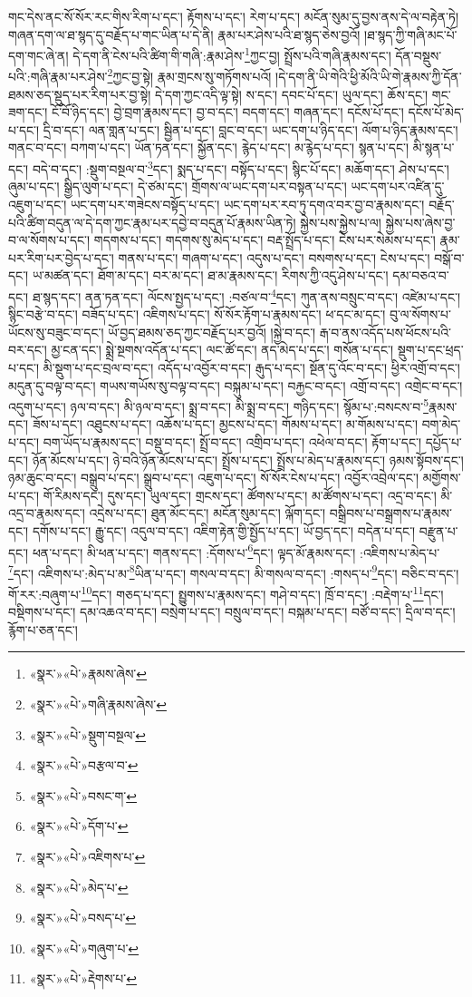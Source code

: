 གང་དེས་ནང་སོ་སོར་རང་གིས་རིག་པ་དང་། རྟོགས་པ་དང་། རེག་པ་དང་། མངོན་སུམ་དུ་བྱས་ནས་དེ་ལ་བརྟེན་ཏེ། གཞན་དག་ལ་ཐ་སྙད་དུ་བརྗོད་པ་གང་ཡིན་པ་དེ་ནི། རྣམ་པར་ཤེས་པའི་ཐ་སྙད་ཅེས་བྱའོ། །ཐ་སྙད་ཀྱི་གཞི་མང་པོ་དག་གང་ཞེ་ན། དེ་དག་ནི་ངེས་པའི་ཚིག་གི་གཞི་:རྣམ་ཤེས་\footnote{«སྣར་»«པེ་»རྣམས་ཞེས་}ཀྱང་བྱ། སྤྲོས་པའི་གཞི་རྣམས་དང་། དོན་བསྡུས་པའི་:གཞི་རྣམ་པར་ཤེས་\footnote{«སྣར་»«པེ་»གཞི་རྣམས་ཞེས་}ཀྱང་བྱ་སྟེ། རྣམ་གྲངས་སུ་གཏོགས་པའོ། །དེ་དག་ནི་ཡི་གེའི་ཕྱི་མོའི་ཡི་གེ་རྣམས་ཀྱི་དོན་ཐམས་ཅད་སྡུད་པར་རིག་པར་བྱ་སྟེ། དེ་དག་ཀྱང་འདི་ལྟ་སྟེ། ས་དང་། དབང་པོ་དང་། ཡུལ་དང་། ཆོས་དང་། གང་ཟག་དང་། ངོ་བོ་ཉིད་དང་། བྱེ་བྲག་རྣམས་དང་། བྱ་བ་དང་། བདག་དང་། གཞན་དང་། དངོས་པོ་དང་། དངོས་པོ་མེད་པ་དང་། དྲི་བ་དང་། ལན་གླན་པ་དང་། སྦྱིན་པ་དང་། བླང་བ་དང་། ཡང་དག་པ་ཉིད་དང་། ལོག་པ་ཉིད་རྣམས་དང་། གནང་བ་དང་། བཀག་པ་དང་། ཡོན་ཏན་དང་། སྐྱོན་དང་། རྙེད་པ་དང་། མ་རྙེད་པ་དང་། སྙན་པ་དང་། མི་སྙན་པ་དང་། བདེ་བ་དང་། :སྡུག་བསྔལ་བ་\footnote{«སྣར་»«པེ་»སྡུག་བསྔལ་}དང་། སྨད་པ་དང་། བསྟོད་པ་དང་། སྙིང་པོ་དང་། མཆོག་དང་། ཤེས་པ་དང་། ཞུམ་པ་དང་། སྒྱིད་ལུག་པ་དང་། དེ་ཙམ་དང་། གྲོགས་ལ་ཡང་དག་པར་བསྟན་པ་དང་། ཡང་དག་པར་འཛིན་དུ་འཇུག་པ་དང་། ཡང་དག་པར་གཟེངས་བསྟོད་པ་དང་། ཡང་དག་པར་རབ་ཏུ་དགའ་བར་བྱ་བ་རྣམས་དང་། བརྗོད་པའི་ཚིག་བདུན་ལ་དེ་དག་ཀྱང་རྣམ་པར་དབྱེ་བ་བདུན་པོ་རྣམས་ཡིན་ཏེ། སྐྱེས་པས་སྐྱེས་པ་ལ། སྐྱེས་པས་ཞེས་བྱ་བ་ལ་སོགས་པ་དང་། གདགས་པ་དང་། གདགས་སུ་མེད་པ་དང་། བརྡ་སྤྲོད་པ་དང་། ངེས་པར་སེམས་པ་དང་། རྣམ་པར་རིག་པར་བྱེད་པ་དང་། གནས་པ་དང་། གཞག་པ་དང་། འདུས་པ་དང་། བསགས་པ་དང་། ངེས་པ་དང་། བསྒོ་བ་དང་། ཡ་མཚན་དང་། ཐོག་མ་དང་། བར་མ་དང་། ཐ་མ་རྣམས་དང་། རིགས་ཀྱི་འདུ་ཤེས་པ་དང་། དམ་བཅའ་བ་དང་། ཐ་སྙད་དང་། ནན་ཏན་དང་། ལོངས་སྤྱད་པ་དང་། :བཙལ་བ་\footnote{«སྣར་»«པེ་»བརྩལ་བ་}དང་། ཀུན་ནས་བསྲུང་བ་དང་། འཛེམ་པ་དང་། སྙིང་བརྩེ་བ་དང་། བཟོད་པ་དང་། འཇིགས་པ་དང་། སོ་སོར་རྟོག་པ་རྣམས་དང་། ཕ་དང་མ་དང་། བུ་ལ་སོགས་པ་ཡོངས་སུ་བཟུང་བ་དང་། ཡོ་བྱད་ཐམས་ཅད་ཀྱང་བརྗོད་པར་བྱའོ། །སྐྱེ་བ་དང་། རྒ་བ་ནས་འདོད་པས་ཕོངས་པའི་བར་དང་། མྱ་ངན་དང་། སྨྲེ་སྔགས་འདོན་པ་དང་། ལང་ཚོ་དང་། ནད་མེད་པ་དང་། གསོན་པ་དང་། སྡུག་པ་དང་ཕྲད་པ་དང་། མི་སྡུག་པ་དང་བྲལ་བ་དང་། འདོད་པ་འབྱོར་བ་དང་། རྒུད་པ་དང་། སྔོན་དུ་འོང་བ་དང་། ཕྱིར་འགྲོ་བ་དང་། མདུན་དུ་བལྟ་བ་དང་། གཡས་གཡོས་སུ་བལྟ་བ་དང་། བསྐུམ་པ་དང་། བརྐྱང་བ་དང་། འགྲོ་བ་དང་། འགྲེང་བ་དང་། འདུག་པ་དང་། ཉལ་བ་དང་། མི་ཉལ་བ་དང་། སྨྲ་བ་དང་། མི་སྨྲ་བ་དང་། གཉིད་དང་། སྙོམ་པ་:བསངས་བ་\footnote{«སྣར་»«པེ་»བསང་ག་}རྣམས་དང་། ཟོས་པ་དང་། འཐུངས་པ་དང་། འཆོས་པ་དང་། མྱངས་པ་དང་། གོམས་པ་དང་། མ་གོམས་པ་དང་། བག་མེད་པ་དང་། བག་ཡོད་པ་རྣམས་དང་། བསྡུ་བ་དང་། སྤྲོ་བ་དང་། འགྲིབ་པ་དང་། འཕེལ་བ་དང་། རྟོག་པ་དང་། དཔྱོད་པ་དང་། ཉོན་མོངས་པ་དང་། ཉེ་བའི་ཉོན་མོངས་པ་དང་། སྤྲོས་པ་དང་། སྤྲོས་པ་མེད་པ་རྣམས་དང་། ཉམས་སྟོབས་དང་། ཉམ་ཆུང་བ་དང་། བསྒྲུབ་པ་དང་། སྒྲུབ་པ་དང་། འཇུག་པ་དང་། སོ་སོར་ངེས་པ་དང་། འབྱོར་འབྲེལ་དང་། མགྱོགས་པ་དང་། གོ་རིམས་དང་། དུས་དང་། ཡུལ་དང་། གྲངས་དང་། ཚོགས་པ་དང་། མ་ཚོགས་པ་དང་། འདྲ་བ་དང་། མི་འདྲ་བ་རྣམས་དང་། འདྲེས་པ་དང་། ཐུན་མོང་དང་། མངོན་སུམ་དང་། ལྐོག་དང་། བསྒྲིབས་པ་བསྒྲགས་པ་རྣམས་དང་། དགོས་པ་དང་། རྒྱུ་དང་། འདུལ་བ་དང་། འཇིག་རྟེན་གྱི་སྤྱོད་པ་དང་། ཡོ་བྱད་དང་། བདེན་པ་དང་། བརྫུན་པ་དང་། ཕན་པ་དང་། མི་ཕན་པ་དང་། གནས་དང་། :དོགས་པ་\footnote{«སྣར་»«པེ་»དོག་པ་}དང་། ལྟད་མོ་རྣམས་དང་། :འཇིགས་པ་མེད་པ་\footnote{«སྣར་»«པེ་»འཇིགས་པ་}དང་། འཇིགས་པ་:མེད་པ་མ་\footnote{«སྣར་»«པེ་»མེད་པ་}ཡིན་པ་དང་། གསལ་བ་དང་། མི་གསལ་བ་དང་། :གསད་པ་\footnote{«སྣར་»«པེ་»བསད་པ་}དང་། བཅིང་བ་དང་། གོ་རར་:བཞུག་པ་\footnote{«སྣར་»«པེ་»གཞུག་པ་}དང་། གཅད་པ་དང་། སྤྱུགས་པ་རྣམས་དང་། གཤེ་བ་དང་། ཁྲོ་བ་དང་། :བརྡེག་པ་\footnote{«སྣར་»«པེ་»རྡེགས་པ་}དང་། བསྡིགས་པ་དང་། དམ་འཆའ་བ་དང་། བསྲེག་པ་དང་། བསྲུལ་བ་དང་། བསྐམ་པ་དང་། བཙོ་བ་དང་། དྲིལ་བ་དང་། རྙོག་པ་ཅན་དང་། 